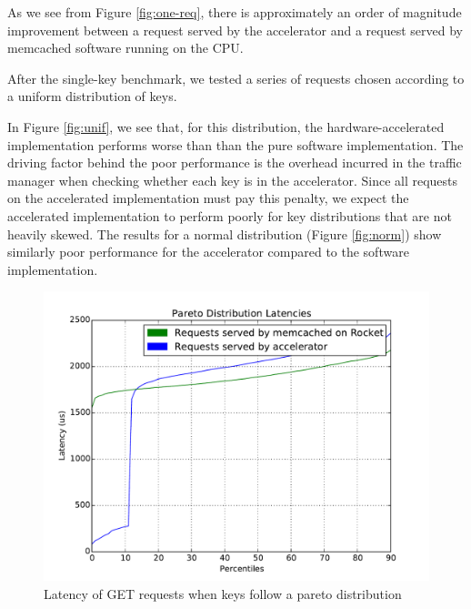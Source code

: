 As we see from Figure \ref{fig:one-req}, there is approximately an order of
magnitude improvement between a request served by the accelerator and a
request served by memcached software running on the CPU.

After the single-key benchmark, we tested a series of requests chosen
according to a uniform distribution of keys.

In Figure \ref{fig:unif}, we see that, for this distribution, the
hardware-accelerated implementation performs worse than than the pure software
implementation. The driving factor behind the poor performance is the overhead
incurred in the traffic manager when checking whether each key is in the accelerator.
Since all requests on the accelerated implementation must pay this penalty,
we expect the accelerated implementation to perform poorly for key
distributions that are not heavily skewed. The results for a normal distribution
(Figure \ref{fig:norm}) show similarly poor performance for the accelerator
compared to the software implementation.

\begin{figure}[t]
\begin{center}
\includegraphics[width=\linewidth]{pareto.pdf}
\caption{Latency of GET requests when keys follow a pareto distribution}
\label{fig:pareto}
\end{center}
\end{figure}

